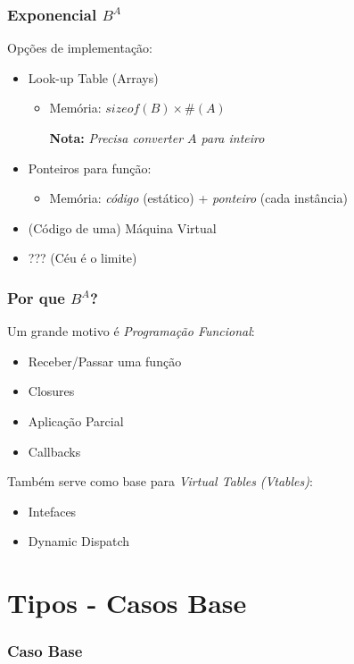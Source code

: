 \documentclass{beamer}
\newcommand{\nota}[1]{\textbf{Nota:}\textit{ #1}}
\newcommand{\typetam}{\#}
\begin{document}
\begin{frame}
    \frametitle{Exponencial \(B^A\)}
    Opções de implementação:
    \begin{itemize}
        \item Look-up Table (Arrays)
            \begin{itemize}
                \item Memória:
                    \(sizeof(B) \times \typetam(A)\)
                    \par
                    \nota{Precisa converter \(A\) para inteiro}
            \end{itemize}
        \vfill
        \pause
        \item Ponteiros para função:
            \begin{itemize}
                \item Memória:
                    \emph{código} (estático)
                    + \emph{ponteiro} (cada instância)
            \end{itemize}
        \vfill
        \pause
        \item (Código de uma) Máquina Virtual
        \vfill
        \pause
        \item ??? (Céu é o limite)
    \end{itemize}
\end{frame}

\begin{frame}
    \frametitle{Por que \(B^A\)?}
    Um grande motivo é \emph{Programação Funcional}:
    \begin{itemize}
        \item Receber/Passar uma função
        \item Closures
        \item Aplicação Parcial
        \item Callbacks
    \end{itemize}
    \vfill
    \pause
    Também serve como base para
    \emph{Virtual Tables} \emph{(Vtables)}:
    \begin{itemize}
        \item Intefaces
        \item Dynamic Dispatch
    \end{itemize}
\end{frame}

\section{Tipos - Casos Base}
\begin{frame}
    \frametitle{Caso Base}
\end{frame}
\end{document}
